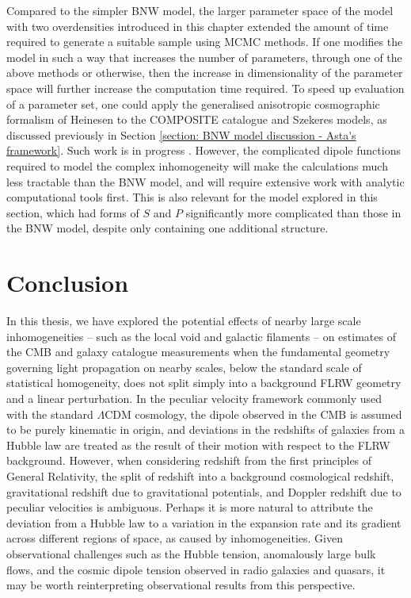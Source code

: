 \documentclass[a4paper,12pt]{report}
\begin{document}
Compared to the simpler BNW model, the larger parameter space of the model with two overdensities introduced in this chapter extended the amount of time required to generate a suitable sample using MCMC methods. If one modifies the model in such a way that increases the number of parameters, through one of the above methods or otherwise, then the increase in dimensionality of the parameter space will further increase the computation time required. To speed up evaluation of a parameter set, one could apply the generalised anisotropic cosmographic formalism of Heinesen \cite{RN235} to the COMPOSITE catalogue and Szekeres models, as discussed previously in Section \ref{section: BNW model discussion - Asta's framework}. Such work is in progress \cite{RN261}. However, the complicated dipole functions required to model the complex inhomogeneity will make the calculations much less tractable than the BNW model, and will require extensive work with analytic computational tools first. This is also relevant for the model explored in this section, which had forms of $S$ and $P$ significantly more complicated than those in the BNW model, despite only containing one additional structure.

\clearpage
\chapter{Conclusion}\label{chapter: conclusion}
In this thesis, we have explored the potential effects of nearby large scale inhomogeneities -- such as the local void and galactic filaments -- on estimates of the CMB and galaxy catalogue measurements when the fundamental geometry governing light propagation on nearby scales, below the standard scale of statistical homogeneity, does not split simply into a background FLRW geometry and a linear perturbation. In the peculiar velocity framework commonly used with the standard $\Lambda$CDM cosmology, the dipole observed in the CMB is assumed to be purely kinematic in origin, and deviations in the redshifts of galaxies from a Hubble law are treated as the result of their motion with respect to the FLRW background. However, when considering redshift from the first principles of General Relativity, the split of redshift into a background cosmological redshift, gravitational redshift due to gravitational potentials, and Doppler redshift due to peculiar velocities is ambiguous. Perhaps it is more natural to attribute the deviation from a Hubble law to a variation in the expansion rate and its gradient across different regions of space, as caused by inhomogeneities. Given observational challenges such as the Hubble tension, anomalously large bulk flows, and the cosmic dipole tension observed in radio galaxies and quasars, it may be worth reinterpreting observational results from this perspective.
\end{document}
